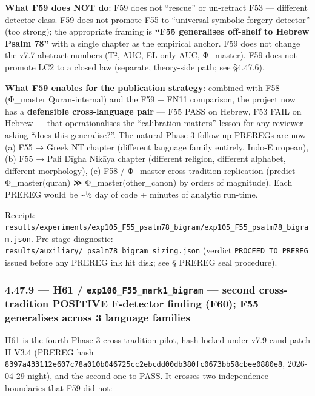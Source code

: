 \documentclass[
]{article}
\begin{document}
\textbf{What F59 does NOT do}: F59 does not ``rescue'' or un-retract F53
--- different detector class. F59 does not promote F55 to ``universal
symbolic forgery detector'' (too strong); the appropriate framing is
\textbf{``F55 generalises off-shelf to Hebrew Psalm 78''} with a single
chapter as the empirical anchor. F59 does not change the v7.7 abstract
numbers (T², AUC, EL-only AUC, Φ\_master). F59 does not promote LC2 to a
closed law (separate, theory-side path; see §4.47.6).

\textbf{What F59 enables for the publication strategy}: combined with
F58 (Φ\_master Quran-internal) and the F59 + FN11 comparison, the
project now has a \textbf{defensible cross-language pair} --- F55 PASS
on Hebrew, F53 FAIL on Hebrew --- that operationalises the ``calibration
matters'' lesson for any reviewer asking ``does this generalise?''. The
natural Phase-3 follow-up PREREGs are now (a) F55 → Greek NT chapter
(different language family entirely, Indo-European), (b) F55 → Pali
Dīgha Nikāya chapter (different religion, different alphabet, different
morphology), (c) F58 / Φ\_master cross-tradition replication (predict
Φ\_master(quran) ≫ Φ\_master(other\_canon) by orders of magnitude). Each
PREREG would be \textasciitilde½ day of code + minutes of analytic
run-time.

Receipt:
\texttt{results/experiments/exp105\_F55\_psalm78\_bigram/exp105\_F55\_psalm78\_bigram.json}.
Pre-stage diagnostic:
\texttt{results/auxiliary/\_psalm78\_bigram\_sizing.json} (verdict
\texttt{PROCEED\_TO\_PREREG} issued before any PREREG ink hit disk; see
§ PREREG seal procedure).

\subsubsection{\texorpdfstring{4.47.9 --- H61 /
\texttt{exp106\_F55\_mark1\_bigram} --- second cross-tradition POSITIVE
F-detector finding (F60); F55 generalises across 3 language
families}{4.47.9 --- H61 / exp106\_F55\_mark1\_bigram --- second cross-tradition POSITIVE F-detector finding (F60); F55 generalises across 3 language families}}\label{h61-exp106_f55_mark1_bigram-second-cross-tradition-positive-f-detector-finding-f60-f55-generalises-across-3-language-families}

H61 is the fourth Phase-3 cross-tradition pilot, hash-locked under
v7.9-cand patch H V3.4 (PREREG hash
\texttt{8397a433112e607c78a010b046725cc2ebcdd00db380fc0673bb58cbee0880e8},
2026-04-29 night), and the second one to PASS. It crosses two
independence boundaries that F59 did not:
\end{document}
